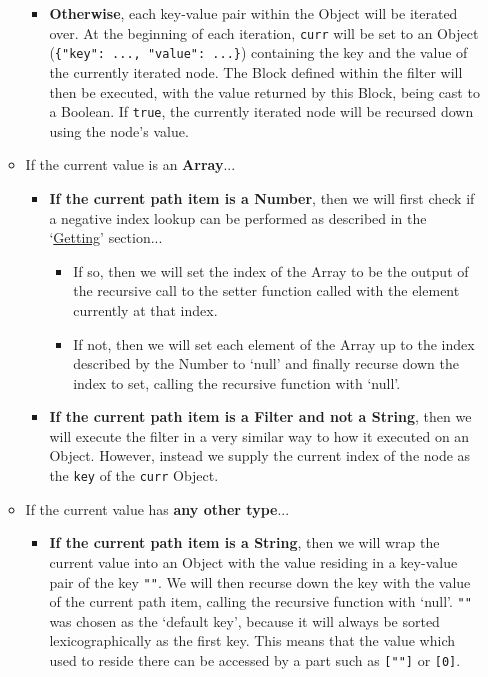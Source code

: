 \begin{center}
\begin{itemize}
\begin{itemize}
\begin{itemize}
\begin{itemize}
                \end{itemize}
                \item \textbf{Otherwise}, each key-value pair within the Object will be iterated over. At the beginning of each iteration, \verb|curr| will be set to an Object (\verb|{"key": ..., "value": ...}|) containing the key and the value of the currently iterated node. The Block defined within the filter will then be executed, with the value returned by this Block, being cast to a Boolean. If \verb|true|, the currently iterated node will be recursed down using the node's value.
            \end{itemize}
            \item If the current value is an \textbf{Array}...
            \begin{itemize}
                \item \textbf{If the current path item is a Number}, then we will first check if a negative index lookup can be performed as described in the `\hyperref[sec:jsonpath-getting]{Getting}' section...
                \begin{itemize}
                    \item If so, then we will set the index of the Array to be the output of the recursive call to the setter function called with the element currently at that index.
                    \item If not, then we will set each element of the Array up to the index described by the Number to `null' and finally recurse down the index to set, calling the recursive function with `null'.
                \end{itemize}
                \item \textbf{If the current path item is a Filter and not a String}, then we will execute the filter in a very similar way to how it executed on an Object. However, instead we supply the current index of the node as the \verb|key| of the \verb|curr| Object.
            \end{itemize}
            \item If the current value has \textbf{any other type}...
            \begin{itemize}
                \item \textbf{If the current path item is a String}, then we will wrap the current value into an Object with the value residing in a key-value pair of the key \verb|""|. We will then recurse down the key with the value of the current path item, calling the recursive function with `null'. \verb|""| was chosen as the `default key', because it will always be sorted lexicographically as the first key. This means that the value which used to reside there can be accessed by a part such as \verb|[""]| or \verb|[0]|.

\end{itemize}
\end{itemize}
\end{itemize}
\end{center}
